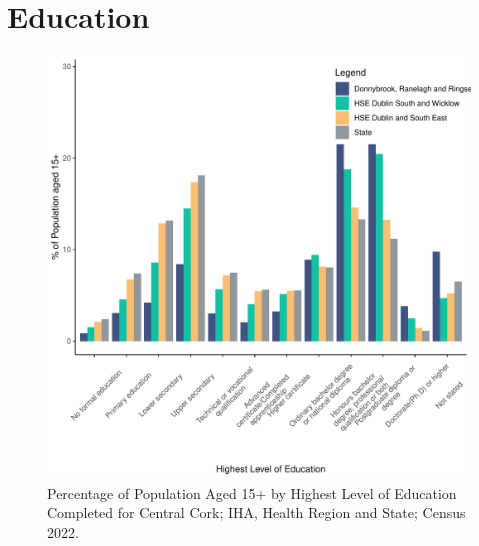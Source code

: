 \documentclass{article}
\begin{document}
\section{Education}\label{sect:Edu}
\begin{figure}[H]
	\centering
	\includegraphics[width = 120mm]{../figures/EduED.pdf}
	\caption{Percentage of Population Aged 15+ by Highest Level of Education Completed for Central Cork; IHA, Health Region and State; Census 2022.}
	\label{fig:vbnv}
	\end{figure}
\end{document}
